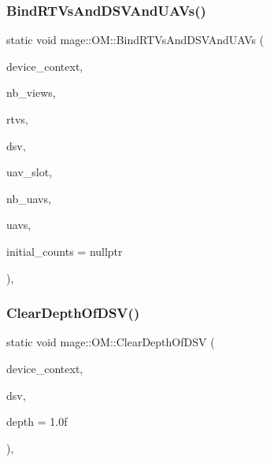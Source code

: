 \hypertarget{structmage_1_1_o_m_a7abfd505e3b2c5d9bf87b8a70fdc4c51}{}\label{structmage_1_1_o_m_a7abfd505e3b2c5d9bf87b8a70fdc4c51} 
\subsubsection{\texorpdfstring{Bind\+R\+T\+Vs\+And\+D\+S\+V\+And\+U\+A\+Vs()}{BindRTVsAndDSVAndUAVs()}}
{\footnotesize\ttfamily static void mage\+::\+O\+M\+::\+Bind\+R\+T\+Vs\+And\+D\+S\+V\+And\+U\+A\+Vs (\begin{DoxyParamCaption}\item[{I\+D3\+D11\+Device\+Context2 $\ast$}]{device\+\_\+context,  }\item[{U\+I\+NT}]{nb\+\_\+views,  }\item[{I\+D3\+D11\+Render\+Target\+View $\ast$const $\ast$}]{rtvs,  }\item[{I\+D3\+D11\+Depth\+Stencil\+View $\ast$}]{dsv,  }\item[{U\+I\+NT}]{uav\+\_\+slot,  }\item[{U\+I\+NT}]{nb\+\_\+uavs,  }\item[{I\+D3\+D11\+Unordered\+Access\+View $\ast$const $\ast$}]{uavs,  }\item[{const U\+I\+NT $\ast$}]{initial\+\_\+counts = {\ttfamily nullptr} }\end{DoxyParamCaption})\hspace{0.3cm}{\ttfamily [static]}, {\ttfamily [noexcept]}}

\hypertarget{structmage_1_1_o_m_ad6f5ebe106423f1209b83cdac3dcfd0e}{}\label{structmage_1_1_o_m_ad6f5ebe106423f1209b83cdac3dcfd0e} 
\subsubsection{\texorpdfstring{Clear\+Depth\+Of\+D\+S\+V()}{ClearDepthOfDSV()}}
{\footnotesize\ttfamily static void mage\+::\+O\+M\+::\+Clear\+Depth\+Of\+D\+SV (\begin{DoxyParamCaption}\item[{I\+D3\+D11\+Device\+Context2 $\ast$}]{device\+\_\+context,  }\item[{I\+D3\+D11\+Depth\+Stencil\+View $\ast$}]{dsv,  }\item[{F\+L\+O\+AT}]{depth = {\ttfamily 1.0f} }\end{DoxyParamCaption})\hspace{0.3cm}{\ttfamily [static]}, {\ttfamily [noexcept]}}

